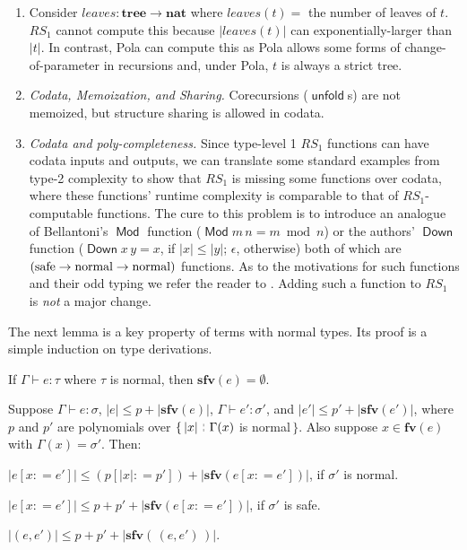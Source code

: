 \documentclass[envcountsame]{llncs}
\newcommand{\sfv}{\ensuremath{\mathbf{sfv}}}\newcommand{\ssize}[1]{\Vert #1\Vert}
\newcommand{\key}[1]{\ensuremath{\mathop{\mathsf{#1}}\nolimits}\xspace}
\newcommand{\unfold}{\key{unfold}}
\newcommand{\type}[1]{\ensuremath{\mathbf{#1}}\xspace}
\newcommand{\Nat}{\type{nat}}
\newcommand{\Tree}{\type{tree}}
\newcommand{\constr}[1]{\ensuremath{\mathop{\mathsf{#1}}\nolimits}\xspace}
\newcommand{\asize}[1]{\ensuremath{\mathopen{|}#1\mathclose{|}}\xspace}
\newcommand{\RSi}{\mathit{RS_1}}
\renewcommand{\gets}{\ensuremath{\mathrel{\colon=}}\xspace}
\newcommand{\entails}{\vdash}
\newcommand{\suchthat}{\mathrel{\,\stackrel{\rule{0.03em}{0.5ex}}{\rule[-.1ex]{0.03em}{0.5ex}}\,}}
\newcommand{\fv}{\ensuremath{\mathbf{fv}}}
\newcommand{\of}{\colon}
\renewcommand{\colon}{\mathpunct{:}}
\begin{document}
\begin{enumerate}
\item 
  Consider $\mathit{leaves}\of\Tree\to\Nat$ where 
  $\mathit{leaves}(t) =$ the number of leaves of $t$.
  $\RSi$ cannot compute this because $\asize{\mathit{leaves}(t)}$
  can   exponentially-larger than $\asize{t}$.
  In contrast, Pola can compute this as Pola
  allows some forms of change-of-parameter in recursions and,
  under Pola, $t$ is always a strict tree.
\item 
  \emph{Codata, Memoization, and Sharing.}
  Corecursions ($\unfold$s) are not memoized, but structure
  sharing is allowed in codata. 


\item

  \emph{Codata and poly-completeness.}
  Since type-level 1 $\RSi$ functions can have codata inputs 
  and outputs, we can translate some standard examples from
  type-2 complexity to show that $\RSi$ is missing some 
  functions over codata, where these functions' runtime
  complexity is comparable to that of $\RSi$-computable 
  functions. 
  The cure to this problem is to introduce an analogue of 
  Bellantoni's $\constr{Mod}$ function 
  \cite[Chapter 8]{bellantoni:thesis}  
  ($\constr{Mod} m\, n = m\bmod n$) or the authors' $\constr{Down}$
  function \cite[\S4]{DR:ATS:LMCS}
  ($\constr{Down} x\,y = x$, if $\asize{x}\leq\asize{y}$; 
  $\epsilon$, otherwise) both of which are 
  $(\hbox{safe}\to\hbox{normal}\to\hbox{normal})$ functions. 
  As to the motivations for such functions and their odd typing
  we refer the reader to \cite{DR:ATS:LMCS}.
  Adding such a function to $\RSi$ is \emph{not} a major change.
  

\end{enumerate}




The next lemma is a key property of terms with normal types.
Its proof is a simple induction on type derivations.

\begin{lemma}
\label{l:L1:sclosed} 
  If 
$\Gamma \entails e\of\tau$ where $\tau$ is normal,
  then $\sfv(e)=\emptyset$.
\end{lemma} 


\begin{lemma} \label{l:ph}
Suppose $\Gamma\entails e\of\sigma$, 
$\asize{e}\leq p+\asize{\sfv(e)}$, 
$\Gamma\entails e'\of\sigma'$, 
and $\asize{e'}\leq p'+\asize{\sfv(e')}$, 
where $p$ and $p'$ are  polynomials over 
$\{\,\asize{x} \suchthat \Gamma(x)$ is normal$\,\}$.
Also suppose $x\in\fv(e)$ with $\Gamma(x)=\sigma'$.
Then:
\begin{asparaenum}[(a)]
 \item \label{i:norm:sub}
$\asize{e[x\gets e']}\leq 
     (p[\asize{x}\gets p'])+\asize{\sfv(e[x\gets e'])}$,
     if $\sigma'$ is normal.
  \item \label{i:safe:sub}
$\asize{e[x\gets e']}\leq 
     p+p'+\asize{\sfv(e[x\gets e'])}$,
    if $\sigma'$ is safe.
  \item  \label{i:pair}
$\asize{(e,e')} \leq p+p'+\asize{\sfv(\,(e,e')\,)}$.
\end{asparaenum}
\end{lemma}
\end{document}
